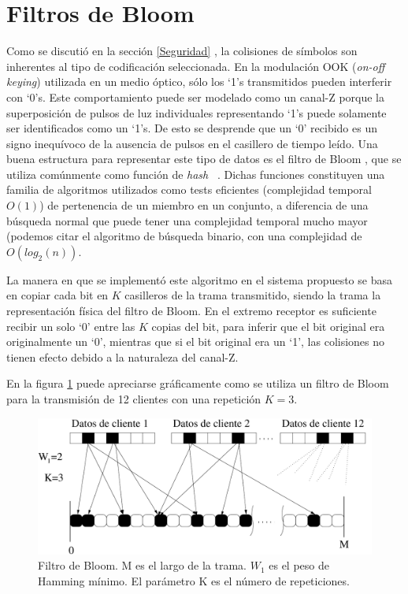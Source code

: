 \section{Filtros de Bloom}
\label{Bloomf}
Como se discutió en la sección \ref{Seguridad} , la colisiones de símbolos son inherentes al tipo de codificación seleccionada.
En la modulación OOK (\textit{on-off keying}) utilizada en un medio óptico, sólo los ‘1’s transmitidos pueden interferir con ‘0’s. Este comportamiento puede ser modelado como un canal-Z porque la superposición de pulsos de luz individuales representando ‘1’s puede solamente ser identificados como un ‘1’s. De esto se desprende que un ‘0’ recibido es un signo inequívoco de la ausencia de pulsos en el casillero de tiempo leído.
Una buena estructura para representar este tipo de datos es el filtro de Bloom \cite{Bloom70space/timetrade-offs}, que se utiliza comúnmente como función de \textit{hash}~ \cite{song2005fast}. Dichas funciones constituyen una familia de algoritmos utilizados como tests eficientes (complejidad temporal $O(1)$) de pertenencia de un miembro en un conjunto, a diferencia de una búsqueda normal que puede tener una complejidad temporal mucho mayor (podemos citar el algoritmo de búsqueda binario, con una complejidad de $O(log_2(n))$.

La manera en que se implementó este algoritmo en el sistema propuesto se basa en copiar cada bit en $K$ casilleros de la trama transmitido, siendo la trama la representación física del filtro de Bloom.
En el extremo receptor es suficiente recibir un solo ‘0’ entre las $K$ copias del bit, para inferir que el bit original era originalmente un ‘0’, mientras que si el bit original era un ‘1’, las colisiones no tienen efecto debido a la naturaleza del canal-Z.

En la figura \ref{fig:Bloomf} puede apreciarse gráficamente como se utiliza un filtro de Bloom para la transmisión de 12 clientes con una repetición $K=3$. 

\begin{figure}[th]
  \begin{center}
    \includegraphics[scale=0.55]{graphs/frame-sp}
  \end{center}
  \caption{Filtro de Bloom. M es el largo de la trama. $W_1$ es el peso de Hamming mínimo. El parámetro K es el número de repeticiones.}
  \label{fig:Bloomf}
\end{figure}

